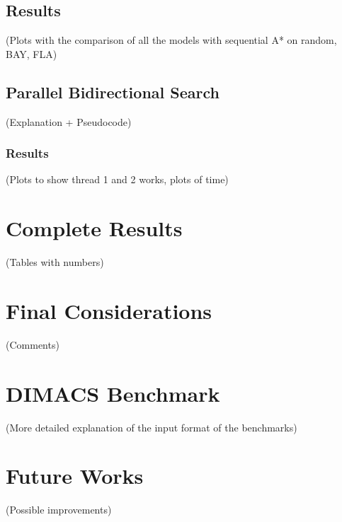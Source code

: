 \documentclass[twocolumn, switch]{article} %
\begin{document}
\subsection{Results}
(Plots with the comparison of all the models with sequential A* on
random, BAY, FLA)

\subsection{Parallel Bidirectional Search}
(Explanation + Pseudocode)
\subsubsection{Results}
(Plots to show thread 1 and 2 works, plots of time)

\section{Complete Results}
(Tables with numbers)

\section{Final Considerations}
(Comments)

\section{DIMACS Benchmark}
(More detailed explanation of the input format of the benchmarks)

\section{Future Works}
(Possible improvements)






\normalsize



\end{document}
